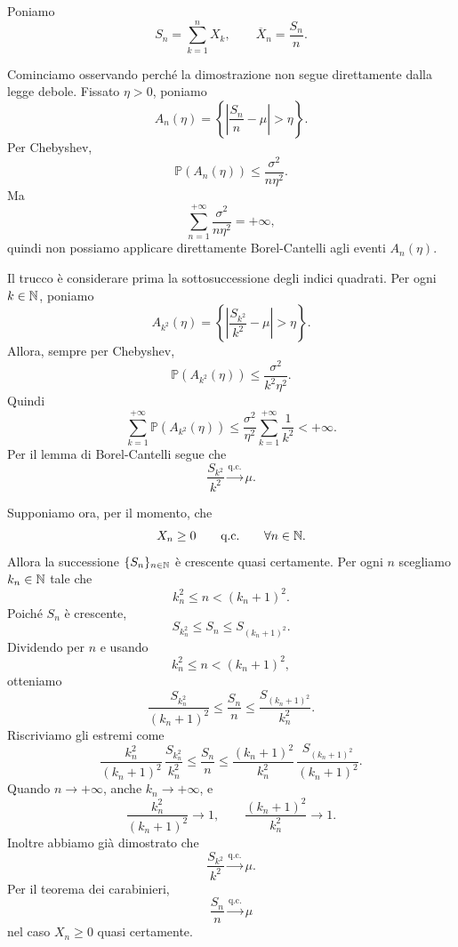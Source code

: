 \documentclass[a4paper]{article}
\begin{document}
\begin{snippetproof}{}
    Poniamo
    \[
        S_n=\sum_{k=1}^{n}X_k,
        \qquad
        \overline{X}_n=\frac{S_n}{n}.
    \]

    Cominciamo osservando perché la dimostrazione non segue direttamente dalla legge debole. Fissato \(\eta>0\), poniamo
    \[
        A_n(\eta)=
        \left\{
            \left|\frac{S_n}{n}-\mu\right|>\eta
        \right\}.
    \]
    Per Chebyshev,
    \[
        \mathbb{P}(A_n(\eta))
        \leq
        \frac{\sigma^2}{n\eta^2}.
    \]
    Ma
    \[
        \sum_{n=1}^{+\infty}\frac{\sigma^2}{n\eta^2}=+\infty,
    \]
    quindi non possiamo applicare direttamente Borel-Cantelli agli eventi \(A_n(\eta)\).

    Il trucco è considerare prima la sottosuccessione degli indici quadrati. Per ogni \(k\in\mathbb{N}\), poniamo
    \[
        A_{k^2}(\eta)=
        \left\{
            \left|\frac{S_{k^2}}{k^2}-\mu\right|>\eta
        \right\}.
    \]
    Allora, sempre per Chebyshev,
    \[
        \mathbb{P}(A_{k^2}(\eta))
        \leq
        \frac{\sigma^2}{k^2\eta^2}.
    \]
    Quindi
    \[
        \sum_{k=1}^{+\infty}\mathbb{P}(A_{k^2}(\eta))
        \leq
        \frac{\sigma^2}{\eta^2}\sum_{k=1}^{+\infty}\frac1{k^2}
        <+\infty.
    \]
    Per il lemma di Borel-Cantelli segue che
    \[
        \frac{S_{k^2}}{k^2}\xrightarrow{\text{q.c.}}\mu.
    \]

    Supponiamo ora, per il momento, che
    \[
        X_n\geq0
        \qquad
        \text{q.c.}
        \qquad
        \forall n\in\mathbb{N}.
    \]
    Allora la successione \(\{S_n\}_{n\in\mathbb{N}}\) è crescente quasi certamente. Per ogni \(n\) scegliamo \(k_n\in\mathbb{N}\) tale che
    \[
        k_n^2\leq n < (k_n+1)^2.
    \]
    Poiché \(S_n\) è crescente,
    \[
        S_{k_n^2}\leq S_n\leq S_{(k_n+1)^2}.
    \]
    Dividendo per \(n\) e usando
    \[
        k_n^2\leq n <(k_n+1)^2,
    \]
    otteniamo
    \[
        \frac{S_{k_n^2}}{(k_n+1)^2}
        \leq
        \frac{S_n}{n}
        \leq
        \frac{S_{(k_n+1)^2}}{k_n^2}.
    \]
    Riscriviamo gli estremi come
    \[
        \frac{k_n^2}{(k_n+1)^2}\,
        \frac{S_{k_n^2}}{k_n^2}
        \leq
        \frac{S_n}{n}
        \leq
        \frac{(k_n+1)^2}{k_n^2}\,
        \frac{S_{(k_n+1)^2}}{(k_n+1)^2}.
    \]
    Quando \(n\to+\infty\), anche \(k_n\to+\infty\), e
    \[
        \frac{k_n^2}{(k_n+1)^2}\longrightarrow1,
        \qquad
        \frac{(k_n+1)^2}{k_n^2}\longrightarrow1.
    \]
    Inoltre abbiamo già dimostrato che
    \[
        \frac{S_{k^2}}{k^2}\xrightarrow{\text{q.c.}}\mu.
    \]
    Per il teorema dei carabinieri,
    \[
        \frac{S_n}{n}\xrightarrow{\text{q.c.}}\mu
    \]
    nel caso \(X_n\geq0\) quasi certamente.


\end{snippetproof}
\end{document}
